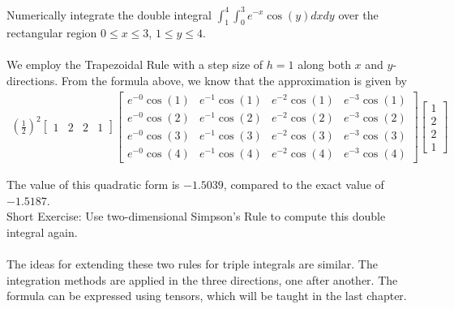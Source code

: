 \begin{exmp}
Numerically integrate the double integral $\int_1^4 \int_0^3 e^{-x}\cos(y) dxdy$ over the rectangular region $0 \leq x \leq 3$, $1 \leq y \leq 4$.\\
\\
We employ the Trapezoidal Rule with a step size of $h = 1$ along both $x$ and $y$-directions. From the formula above, we know that the approximation is given by
\begin{align*}
(\frac{1}{2})^2
\begin{bmatrix}
1 & 2 & 2 & 1
\end{bmatrix}
\begin{bmatrix}
e^{-0}\cos(1) & e^{-1}\cos(1) & e^{-2}\cos(1) & e^{-3}\cos(1) \\
e^{-0}\cos(2) & e^{-1}\cos(2) & e^{-2}\cos(2) & e^{-3}\cos(2) \\
e^{-0}\cos(3) & e^{-1}\cos(3) & e^{-2}\cos(3) & e^{-3}\cos(3) \\
e^{-0}\cos(4) & e^{-1}\cos(4) & e^{-2}\cos(4) & e^{-3}\cos(4) 
\end{bmatrix}
\begin{bmatrix}
1 \\
2 \\
2 \\
1
\end{bmatrix}       
\end{align*}
\end{exmp}
The value of this quadratic form is $-1.5039$, compared to the exact value of $-1.5187$.\\
Short Exercise: Use two-dimensional Simpson's Rule to compute this double integral again.\\
\\
The ideas for extending these two rules for triple integrals are similar. The integration methods are applied in the three directions, one after another. The formula can be expressed using tensors, which will be taught in the last chapter.

